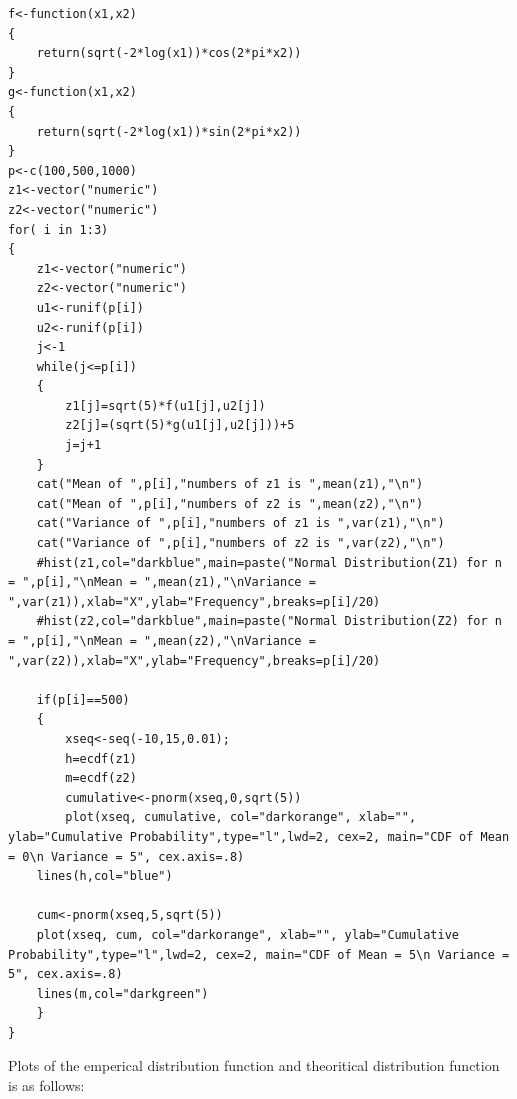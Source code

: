\documentclass[12pt]{book}
\begin{document}
\begin{lstlisting}
f<-function(x1,x2)
{
	return(sqrt(-2*log(x1))*cos(2*pi*x2))
}
g<-function(x1,x2)
{
	return(sqrt(-2*log(x1))*sin(2*pi*x2))
}
p<-c(100,500,1000)
z1<-vector("numeric")
z2<-vector("numeric")
for( i in 1:3)
{
	z1<-vector("numeric")
	z2<-vector("numeric")
	u1<-runif(p[i])
	u2<-runif(p[i])
	j<-1
	while(j<=p[i])
	{
		z1[j]=sqrt(5)*f(u1[j],u2[j])
		z2[j]=(sqrt(5)*g(u1[j],u2[j]))+5
		j=j+1
	}
	cat("Mean of ",p[i],"numbers of z1 is ",mean(z1),"\n")
	cat("Mean of ",p[i],"numbers of z2 is ",mean(z2),"\n")
	cat("Variance of ",p[i],"numbers of z1 is ",var(z1),"\n")
	cat("Variance of ",p[i],"numbers of z2 is ",var(z2),"\n")
	#hist(z1,col="darkblue",main=paste("Normal Distribution(Z1) for n = ",p[i],"\nMean = ",mean(z1),"\nVariance = ",var(z1)),xlab="X",ylab="Frequency",breaks=p[i]/20)
	#hist(z2,col="darkblue",main=paste("Normal Distribution(Z2) for n = ",p[i],"\nMean = ",mean(z2),"\nVariance = ",var(z2)),xlab="X",ylab="Frequency",breaks=p[i]/20)

	if(p[i]==500)
	{
		xseq<-seq(-10,15,0.01);
		h=ecdf(z1)
		m=ecdf(z2)
	    cumulative<-pnorm(xseq,0,sqrt(5))
	    plot(xseq, cumulative, col="darkorange", xlab="", ylab="Cumulative Probability",type="l",lwd=2, cex=2, main="CDF of Mean = 0\n Variance = 5", cex.axis=.8) 
	lines(h,col="blue")

	cum<-pnorm(xseq,5,sqrt(5))
	plot(xseq, cum, col="darkorange", xlab="", ylab="Cumulative Probability",type="l",lwd=2, cex=2, main="CDF of Mean = 5\n Variance = 5", cex.axis=.8)
	lines(m,col="darkgreen") 
	}
}
\end{lstlisting}
Plots of the emperical distribution function and theoritical distribution function is as follows:\\\\
\begin{figure}[H]
	\centering
\end{figure}
\end{document}
